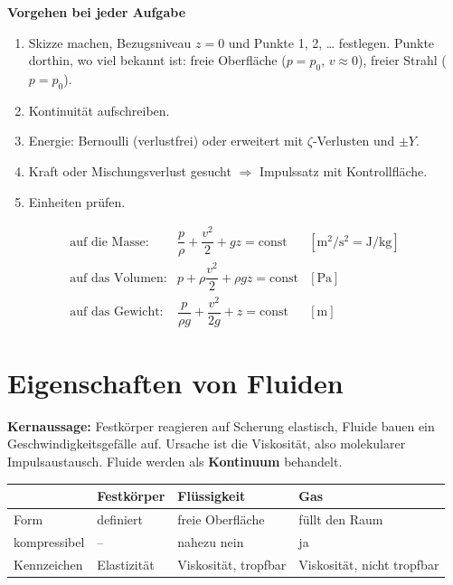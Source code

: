 \documentclass[11pt,a4paper]{article}
\begin{document}
\textbf{Vorgehen bei jeder Aufgabe}
\begin{enumerate}
\item Skizze machen, Bezugsniveau $z=0$ und Punkte 1, 2, \ldots{} festlegen. Punkte dorthin, wo viel bekannt ist: freie Oberfläche ($p = p_0$, $v \approx 0$), freier Strahl ($p = p_0$).
\item Kontinuität aufschreiben.
\item Energie: Bernoulli (verlustfrei) oder erweitert mit $\zeta$-Verlusten und $\pm Y$.
\item Kraft oder Mischungsverlust gesucht $\Rightarrow$ Impulssatz mit Kontrollfläche.
\item Einheiten prüfen.
\end{enumerate}

\begin{formel}[title={Bernoulli in drei Bezugsformen -- gleiche Aussage, anderer Nenner}]
\[
\begin{array}{lll}
\text{auf die Masse:} & \dfrac{p}{\rho} + \dfrac{v^2}{2} + g z = \text{const} & [\mathrm{m^2/s^2} = \mathrm{J/kg}]\\[10pt]
\text{auf das Volumen:} & p + \rho\dfrac{v^2}{2} + \rho g z = \text{const} & [\mathrm{Pa}]\\[10pt]
\text{auf das Gewicht:} & \dfrac{p}{\rho g} + \dfrac{v^2}{2g} + z = \text{const} & [\mathrm{m}]
\end{array}
\]
\end{formel}

\section{Eigenschaften von Fluiden}

\textbf{Kernaussage:} Festkörper reagieren auf Scherung elastisch, Fluide bauen ein Geschwindigkeitsgefälle auf. Ursache ist die Viskosität, also molekularer Impulsaustausch. Fluide werden als \textbf{Kontinuum} behandelt.

\begin{center}
\small
\begin{tabular}{@{}llll@{}}
\toprule
 & Festkörper & Flüssigkeit & Gas \\ \midrule
Form & definiert & freie Oberfläche & füllt den Raum \\
kompressibel & -- & nahezu nein & ja \\
Kennzeichen & Elastizität & Viskosität, tropfbar & Viskosität, nicht tropfbar \\
\bottomrule
\end{tabular}
\end{center}
\end{document}
